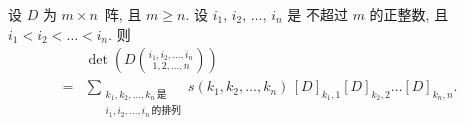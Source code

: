 \begin{theorem}
    设 \(D\) 为 \(m \times n\)~阵,
    且 \(m \geq n\).
    设 \(i_1\), \(i_2\), \(\dots\), \(i_n\) 是%
    不超过 \(m\) 的正整数,
    且 \(i_1 < i_2 < \dots < i_n\).
    则
    \begin{align*}
             &
        \det {\left(
            D\binom{i_1, i_2, \dots, i_n}{1, 2, \dots, n}
            \right)}
        \\
        = {} &
        \sum_{\substack{
        k_1, k_2, \dots, k_n\,\text{是} \\
                i_1, i_2, \dots, i_n\,\text{的排列}
            }}
        {s(k_1, k_2, \dots, k_n)\,
            [D]_{k_1,1} [D]_{k_2,2} \dots [D]_{k_n,n}}.
    \end{align*}
\end{theorem}

